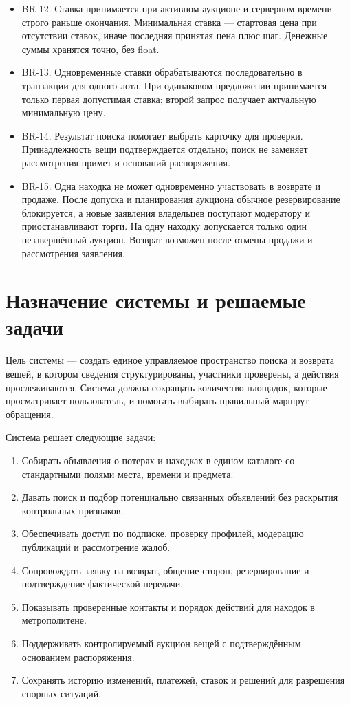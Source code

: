 \begin{itemize}
\item BR-12. Ставка принимается при активном аукционе и серверном времени строго раньше окончания. Минимальная ставка — стартовая цена при отсутствии ставок, иначе последняя принятая цена плюс шаг. Денежные суммы хранятся точно, без float.
\item BR-13. Одновременные ставки обрабатываются последовательно в транзакции для одного лота. При одинаковом предложении принимается только первая допустимая ставка; второй запрос получает актуальную минимальную цену.
\item BR-14. Результат поиска помогает выбрать карточку для проверки. Принадлежность вещи подтверждается отдельно; поиск не заменяет рассмотрения примет и оснований распоряжения.
\item BR-15. Одна находка не может одновременно участвовать в возврате и продаже. После допуска и планирования аукциона обычное резервирование блокируется, а новые заявления владельцев поступают модератору и приостанавливают торги. На одну находку допускается только один незавершённый аукцион. Возврат возможен после отмены продажи и рассмотрения заявления.
\end{itemize}

\clearpage
\section{Назначение системы и решаемые задачи}

Цель системы — создать единое управляемое пространство поиска и возврата вещей, в котором сведения структурированы, участники проверены, а действия прослеживаются. Система должна сокращать количество площадок, которые просматривает пользователь, и помогать выбирать правильный маршрут обращения.

Система решает следующие задачи:

\begin{enumerate}
\item Собирать объявления о потерях и находках в едином каталоге со стандартными полями места, времени и предмета.
\item Давать поиск и подбор потенциально связанных объявлений без раскрытия контрольных признаков.
\item Обеспечивать доступ по подписке, проверку профилей, модерацию публикаций и рассмотрение жалоб.
\item Сопровождать заявку на возврат, общение сторон, резервирование и подтверждение фактической передачи.
\item Показывать проверенные контакты и порядок действий для находок в метрополитене.
\item Поддерживать контролируемый аукцион вещей с подтверждённым основанием распоряжения.
\item Сохранять историю изменений, платежей, ставок и решений для разрешения спорных ситуаций.
\end{enumerate}

